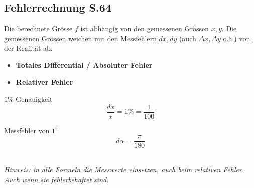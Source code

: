 \subsection{Fehlerrechnung \texorpdfstring{\hfill S.64}{S.64}}
    Die berechnete Grösse $f$ ist abhängig von den gemessenen Grössen $x,y$.
    Die gemessenen Grössen weichen mit den Messfehlern $dx,dy$ (auch $ \varDelta  x, \varDelta  y$ o.ä.) von der Realität ab.
    \begin{itemize}
        \item \textbf{Totales Differential / Absoluter Fehler}
        \item \textbf{Relativer Fehler}
    \end{itemize}
        \vspace{0.5em}
        \begin{minipage}{0.54\linewidth}
            \centering \vspace{4pt}
            $1\%$ Genauigkeit
            $$
                \frac{dx}{x} = 1\% = \frac{1}{100}
            $$          
        \end{minipage}
        \begin{minipage}{0.45\linewidth}
            \centering
            Messfehler von $1^\circ$
            $$
                d\alpha = \frac{\pi}{180}
            $$
        \end{minipage}
        \vspace{3mm}\\
        \textit{Hinweis: in alle Formeln die Messwerte einsetzen, auch beim relativen Fehler. Auch wenn sie fehlerbehaftet sind.}